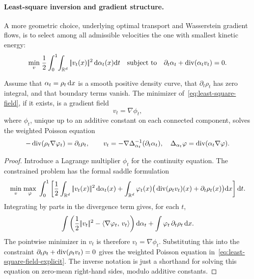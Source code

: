 \paragraph{Least-square inversion and gradient structure.}

A more geometric choice, underlying optimal transport and Wasserstein gradient flows, is to select among all admissible velocities the one with smallest kinetic energy:
\begin{equation}\label{eq:least-square-field}
	\underset{v}{\min}\;
	\frac12\int_0^1\!\int_{\mathbb{R}^d}|\!| v_t(x) |\!|^2\,\mathrm{d}\alpha_t(x)\mathrm{d} t
	\quad
	\text{subject to}
	\quad
	\partial_t\alpha_t+\operatorname{div}(\alpha_t v_t)=0.
\end{equation}

\begin{prop}\label{prop-least-square-gradient-velocity}
	Assume that $\alpha_t=\rho_t\,\mathrm{d} x$ is a smooth positive density curve, that $\partial_t\rho_t$ has zero integral, and that boundary terms vanish. The minimizer of~\eqref{eq:least-square-field}, if it exists, is a gradient field
	\[
		v_t=\nabla\phi_t,
	\]
	where $\phi_t$, unique up to an additive constant on each connected component, solves the weighted Poisson equation
	\begin{equation}\label{eq:least-square-field-explicit}
		-\operatorname{div}(\rho_t\nabla\varphi_t)=\partial_t\rho_t,
		\qquad
		v_t=-\nabla\Delta_{\alpha_t}^{-1}(\partial_t\alpha_t),
		\quad
		\Delta_{\alpha_t}\varphi=\operatorname{div}(\alpha_t\nabla\varphi).
	\end{equation}
\end{prop}

\begin{proof}
	Introduce a Lagrange multiplier $\phi_t$ for the continuity equation. The constrained problem has the formal saddle formulation
	\[
		\underset{v}{\min}\;\underset{\varphi}{\max}\;
		\int_0^1
		\left[
			\frac12\int_{\mathbb{R}^d}|\!| v_t(x) |\!|^2\,\mathrm{d}\alpha_t(x)
			+\int_{\mathbb{R}^d}\varphi_t(x)\big(\operatorname{div}(\rho_t v_t)(x)+\partial_t\rho_t(x)\big)\mathrm{d} x
		\right]\mathrm{d} t.
	\]
	Integrating by parts in the divergence term gives, for each $t$,
	\[
		\int \left(\frac12|\!| v_t |\!|^2-\langle \nabla\varphi_t,\,v_t\rangle\right)\mathrm{d}\alpha_t
		+
		\int \varphi_t\,\partial_t\rho_t\,\mathrm{d} x.
	\]
	The pointwise minimizer in $v_t$ is therefore $v_t=\nabla\phi_t$. Substituting this into the constraint $\partial_t\rho_t+\operatorname{div}(\rho_t v_t)=0$ gives the weighted Poisson equation in~\eqref{eq:least-square-field-explicit}. The inverse notation is just a shorthand for solving this equation on zero-mean right-hand sides, modulo additive constants.
\end{proof}

